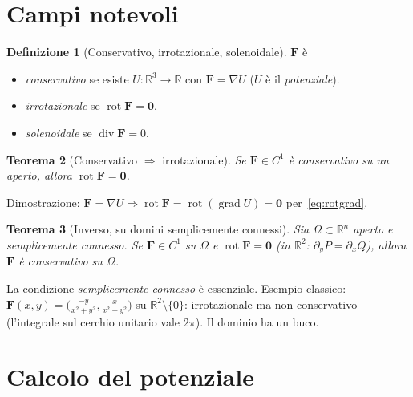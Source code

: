 \documentclass[11pt,a4paper,openany]{book}
\theoremstyle{plain}
\newtheorem{teorema}{Teorema}[chapter]
\theoremstyle{definition}
\newtheorem{definizione}[teorema]{Definizione}
\theoremstyle{remark}
\newcommand{\R}{\mathbb{R}}
\newcommand{\Div}{\operatorname{div}}
\newcommand{\Rot}{\operatorname{rot}}
\newcommand{\Grad}{\operatorname{grad}}
\renewcommand{\vec}[1]{\mathbf{#1}}
\newcommand{\F}{\mathbf{F}}
\begin{document}
\section{Campi notevoli}

\begin{definizione}[Conservativo, irrotazionale, solenoidale]
$\F$ \`e
\begin{itemize}[leftmargin=*]
  \item \emph{conservativo} se esiste $U:\R^3\to\R$ con $\F=\nabla U$ ($U$ \`e
        il \emph{potenziale}).
  \item \emph{irrotazionale} se $\Rot\F=\vec{0}$.
  \item \emph{solenoidale} se $\Div\F=0$.
\end{itemize}
\end{definizione}

\begin{teorema}[Conservativo $\Rightarrow$ irrotazionale]
Se $\F\in C^1$ \`e conservativo su un aperto, allora $\Rot\F=\vec{0}$.
\end{teorema}
Dimostrazione: $\F=\nabla U\Rightarrow\Rot\F=\Rot(\Grad U)=\vec{0}$ per~\eqref{eq:rotgrad}.

\begin{teorema}[Inverso, su domini semplicemente connessi]
Sia $\Omega\subset\R^n$ aperto e \emph{semplicemente connesso}. Se $\F\in C^1$
su $\Omega$ e $\Rot\F=\vec{0}$ (in $\R^2$: $\partial_y P=\partial_x Q$),
allora $\F$ \`e conservativo su $\Omega$.
\end{teorema}

\begin{trappola}
La condizione \emph{semplicemente connesso} \`e essenziale. Esempio classico:
$\F(x,y)=\bigl(\frac{-y}{x^2+y^2},\frac{x}{x^2+y^2}\bigr)$ su $\R^2\setminus\{0\}$:
irrotazionale ma non conservativo (l'integrale sul cerchio unitario vale
$2\pi$). Il dominio ha un buco.
\end{trappola}

\section{Calcolo del potenziale}
\end{document}
